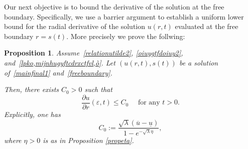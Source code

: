 \documentclass[12pt,a4paper,intlimits,sumlimits]{amsart}
\theoremstyle{definition}
\theoremstyle{plain}
\newtheorem{proposition}[definition]{Proposition}
\numberwithin{equation}{section}
\renewcommand{\le}{\leqslant}
\begin{document}
Our next objective is to bound the derivative of the solution at the free boundary. Specifically,
we use a barrier argument to establish a uniform lower bound for the radial derivative of the solution $u(r, t)$ evaluated at the free boundary $r=s(t)$. More precisely we prove the follwing:

\begin{proposition}\label{lemmabarriera1}
Assume~\eqref{relationutilde2}, \eqref{oiuygtfdoiuy2}, and~\eqref{lpko,mijnhugyftcdrxctfvl,ò}.
Let $(u(r,t), s(t))$ be a solution of~\eqref{mainfinal1} and~\eqref{freeboundary}.  

Then, there exists $C_0>0$ such that
\begin{equation}\label{derivuniflim}
\frac{\partial u}{\partial r}(\varepsilon,t)\le C_0 \quad\mbox{ for any } t>0.
\end{equation}
Explicitly, one has
\begin{equation}\label{09iu8ygvhbdjwenAFLò,RSMKNJHGUY}
C_0:= \dfrac{\sqrt\lambda(\overline u-\underline u)}{1-e^{-\sqrt\lambda \eta}},
\end{equation}
where $\eta>0$ is as in Proposition \ref{propeta}.
\end{proposition}
\end{document}
